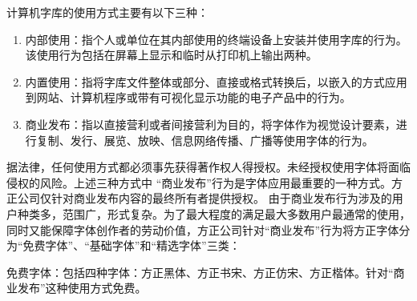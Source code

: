 \documentclass[11pt,a4paper,UTF8,titlepage]{ctexart} %
\begin{document}
    计算机字库的使用方式主要有以下三种：
    \begin{enumerate}
        \item 内部使用：指个人或单位在其内部使用的终端设备上安装并使用字库的行为。该使用行为包括在屏幕上显示和临时从打印机上输出两种。
        \item 内置使用：指将字库文件整体或部分、直接或格式转换后，以嵌入的方式应用到网站、计算机程序或带有可视化显示功能的电子产品中的行为。
        \item 商业发布：指以直接营利或者间接营利为目的，将字体作为视觉设计要素，进行复制、发行、展览、放映、信息网络传播、广播等使用字体的行为。
    \end{enumerate}

    据法律，任何使用方式都必须事先获得著作权人得授权。未经授权使用字体将面临侵权的风险。上述三种方式中 “商业发布”行为是字体应用最重要的一种方式。方正公司仅针对商业发布内容的最终所有者提供授权。 由于商业发布行为涉及的用户种类多，范围广，形式复杂。为了最大程度的满足最大多数用户最通常的使用，同时又能保障字体创作者的劳动价值，方正公司针对“商业发布”行为将方正字体分为“免费字体”、“基础字体”和“精选字体”三类：

    免费字体：包括四种字体：方正黑体、方正书宋、方正仿宋、方正楷体。针对“商业发布”这种使用方式免费。

    \nocite{*} %
    \printbibliography %
    \clearpage %
    \printindex %
\end{document}

